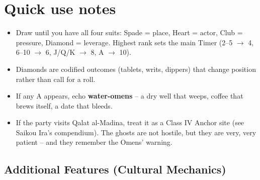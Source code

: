 \section*{Quick use notes}
\label{sec:fhara-quick-use}
\begin{itemize}
\item Draw until you have all four suits: Spade = place, Heart = actor, Club = pressure, Diamond = leverage. Highest rank sets the main Timer (2--5 \(\rightarrow\) 4, 6--10 \(\rightarrow\) 6, J/Q/K \(\rightarrow\) 8, A \(\rightarrow\) 10).
\item Diamonds are codified outcomes (tablets, writs, dippers) that change position rather than call for a roll.
\item If any A appears, echo \textbf{water-omens} -- a dry well that weeps, coffee that brews itself, a date that bleeds.
\item If the party visits Qalat al-Madina, treat it as a Class IV Anchor site (see Saikou Ira's compendium). The ghosts are not hostile, but they are very, very patient -- and they remember the Omens' warning.
\end{itemize}

\subsection*{Additional Features (Cultural Mechanics)}
\label{sec:fhara-mechanics}

